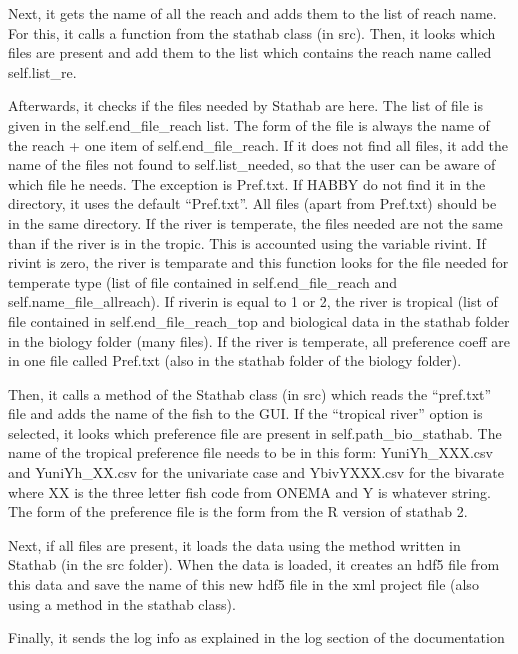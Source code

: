 \documentclass[letterpaper,10pt,english]{sphinxmanual}
\begin{document}
\begin{fulllineitems}
\begin{fulllineitems}
Next, it gets the name of all the reach and adds them to the list of reach name. For this, it calls a function
from the stathab class (in src). Then, it looks which files are present and add them to the list which contains
the reach name called self.list\_re.

Afterwards, it checks if the files needed by Stathab are here. The list of file is given in the
self.end\_file\_reach list. The form of the file is always the name of the reach + one item of
self.end\_file\_reach. If it does not find all files, it add the name of the files not found to self.list\_needed,
so that the user can be aware of which file he needs. The exception is Pref.txt. If HABBY do not find it in the
directory, it uses the default “Pref.txt”. All files (apart from Pref.txt) should be in the same directory.
If the river is temperate, the files needed are not the same than if the river is in the tropic. This is
accounted using the variable rivint. If rivint is zero, the river is temparate and this function looks for the
file needed for temperate type (list of file contained in self.end\_file\_reach and self.name\_file\_allreach).
If riverin is equal to 1 or 2, the river is tropical (list of file contained in self.end\_file\_reach\_top and
biological data in the stathab folder in the biology folder (many files). If the river is temperate,
all preference coeff are in one file called Pref.txt (also in the stathab folder of the biology folder).

Then, it calls a method of the Stathab class (in src) which reads the “pref.txt” file and adds the name
of the fish to the GUI. If the ``tropical river'' option is selected, it looks which preference file are present
in self.path\_bio\_stathab. The name of the tropical preference file needs to be in this form: YuniYh\_XXX.csv and
YuniYh\_XX.csv for the univariate case and YbivYXXX.csv for the bivarate where XX is the three letter fish code
from ONEMA and Y is whatever string. The form of the preference file is the form from the R version of
stathab 2.

Next, if all files are present, it loads the data using the method written in Stathab
(in the src folder). When the data is loaded, it creates an hdf5 file from this data and save the name of this
new hdf5 file in the xml project file (also using a method in the stathab class).

Finally, it sends the log info as explained in the log section of the documentation

\end{fulllineitems}


\end{fulllineitems}
\end{document}
